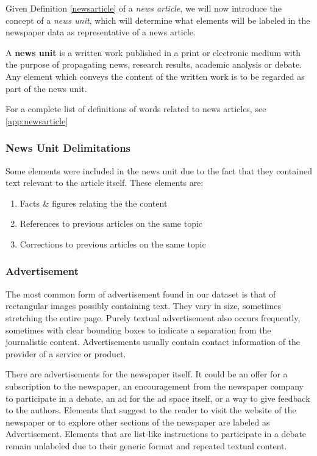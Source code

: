 \documentclass[oneside, english, bibtex]{kththesis}
\begin{document}
Given Definition \ref{newsarticle} of a \textit{news article}, we will now introduce the concept of a \textit{news unit}, which will determine what elements will be labeled in the newspaper data as representative of a news article.

\begin{definition}
\label{newsunit}
A \textbf{news unit} is a written work published in a print or electronic medium with the purpose of propagating news, research results, academic analysis or debate. Any element which conveys the content of the written work is to be regarded as part of the news unit.
\end{definition}

For a complete list of definitions of words related to news articles, see \autoref{app:newsarticle}

\subsubsection{News Unit Delimitations}

Some elements were included in the news unit due to the fact that they contained text relevant to the article itself. These elements are:

\begin{enumerate}
\item Facts \& figures relating the the content
\item References to previous articles on the same topic
\item Corrections to previous articles on the same topic
\end{enumerate}

\subsubsection{Advertisement}

The most common form of advertisement found in our dataset is that of rectangular images possibly containing text.
They vary in size, sometimes stretching the entire page.
Purely textual advertisement also occurs frequently, sometimes with clear bounding boxes to indicate a separation from the journalistic content.
Advertisements usually contain contact information of the provider of a service or product.

There are advertisements for the newspaper itself.
It could be an offer for a subscription to the newspaper,
an encouragement from the newspaper company to participate in a debate, an ad for the ad space itself,
or a way to give feedback to the authors. Elements that suggest to the reader to visit the website of the newspaper
or to explore other sections of the newspaper are labeled as Advertisement.
Elements that are list-like instructions to participate in a debate remain unlabeled due to their generic format and repeated textual content.
\end{document}
